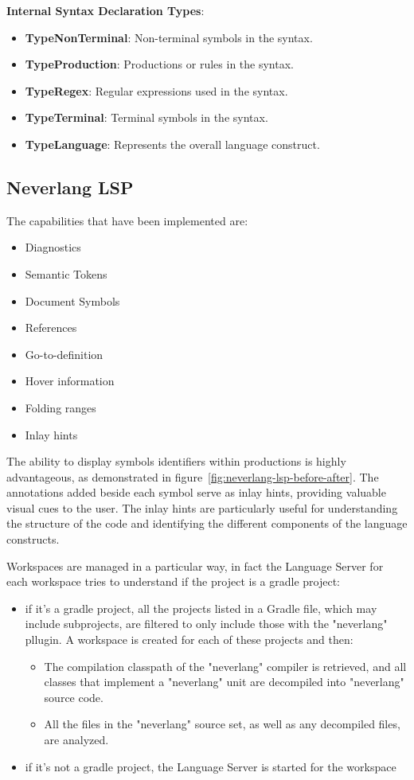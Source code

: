 \hfill \break
\noindent
\textbf{Internal Syntax Declaration Types}:
\begin{itemize}
\item \textbf{TypeNonTerminal}: Non-terminal symbols in the syntax.
\item \textbf{TypeProduction}: Productions or rules in the syntax.
\item \textbf{TypeRegex}: Regular expressions used in the syntax.
\item \textbf{TypeTerminal}: Terminal symbols in the syntax.
\item \textbf{TypeLanguage}: Represents the overall language construct.
\end{itemize}

\subsection{Neverlang LSP}\label{subsec:neverlang-lsp}

The capabilities that have been implemented are:
\begin{itemize}
    \item Diagnostics
    \item Semantic Tokens
    \item Document Symbols
    \item References
    \item Go-to-definition
    \item Hover information
    \item Folding ranges
    \item Inlay hints
\end{itemize}

The ability to display symbols identifiers within productions is highly advantageous, as demonstrated in figure~\ref{fig:neverlang-lsp-before-after}. The annotations added beside each symbol serve as inlay hints, providing valuable visual cues to the user. The inlay hints are particularly useful for understanding the structure of the code and identifying the different components of the language constructs.

Workspaces are managed in a particular way, in fact the Language Server for each workspace tries to understand if the project is a gradle project:
\begin{itemize}
    \item if it’s a gradle project, all the projects listed in a Gradle file, which may include subprojects, are filtered to only include those with the "neverlang" pllugin. A workspace is created for each of these projects and then:
    \begin{itemize}
        \item The compilation classpath of the "neverlang" compiler is retrieved, and all classes that implement a "neverlang" unit are decompiled into "neverlang" source code.
        \item All the files in the "neverlang" source set, as well as any decompiled files, are analyzed.
    \end{itemize}
    \item if it’s not a gradle project, the Language Server is started for the workspace
\end{itemize}


